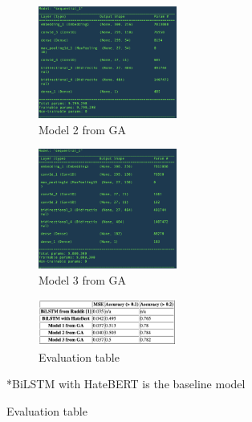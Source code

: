 \documentclass[11pt, natbib=false]{article}
\begin{document}
\newpage
\begin{figure}[h!]\ContinuedFloat
  \centering

  \begin{subfigure}[b]{1.0\linewidth}
  \centering
  \caption{Model 2 from GA}
  \includegraphics[width=0.5\textwidth]{./GA_model2.png}
  \end{subfigure}

  \begin{subfigure}[b]{1.0\linewidth}
  \centering
  \caption{Model 3 from GA}
  \includegraphics[width=0.5\textwidth]{./GA_model3.png}
  \end{subfigure}

  \begin{subfigure}[b]{1.0\linewidth}
  \centering
  \caption{Evaluation table}
  \includegraphics[width=0.5\textwidth]{./comparison_table.png}
  \end{subfigure}
  *BiLSTM with HateBERT is the baseline model
\end{figure}
\end{document}
